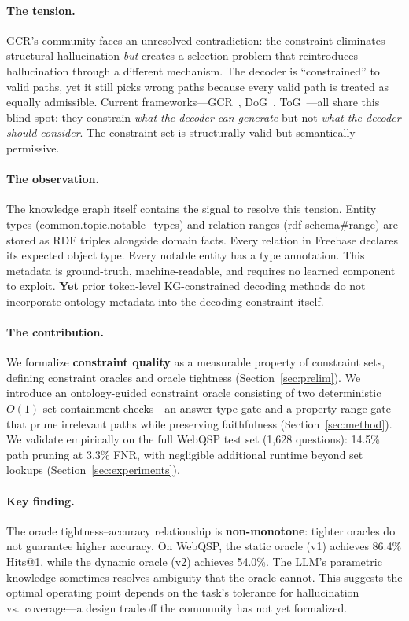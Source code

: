 \documentclass[11pt,twoside]{article}
\begin{document}
\paragraph{The tension.} GCR's community faces an unresolved contradiction: the constraint eliminates structural hallucination \emph{but} creates a selection problem that reintroduces hallucination through a different mechanism. The decoder is ``constrained'' to valid paths, yet it still picks wrong paths because every valid path is treated as equally admissible. Current frameworks---GCR~\citep{luo2025-graph-constrained-reasoning}, DoG~\citep{li2024-decoding-on-graphs}, ToG~\citep{sun2024tog}---all share this blind spot: they constrain \emph{what the decoder can generate} but not \emph{what the decoder should consider}. The constraint set is structurally valid but semantically permissive.

\paragraph{The observation.} The knowledge graph itself contains the signal to resolve this tension. Entity types (\url{common.topic.notable_types}) and relation ranges (rdf-schema\#range) are stored as RDF triples alongside domain facts. Every relation in Freebase declares its expected object type. Every notable entity has a type annotation. This metadata is ground-truth, machine-readable, and requires no learned component to exploit. \textbf{Yet} prior token-level KG-constrained decoding methods do not incorporate ontology metadata into the decoding constraint itself.

\paragraph{The contribution.} We formalize \textbf{constraint quality} as a measurable property of constraint sets, defining constraint oracles and oracle tightness (Section~\ref{sec:prelim}). We introduce an ontology-guided constraint oracle consisting of two deterministic \(O(1)\) set-containment checks---an answer type gate and a property range gate---that prune irrelevant paths while preserving faithfulness (Section~\ref{sec:method}). We validate empirically on the full WebQSP test set (1,628 questions): 14.5\% path pruning at 3.3\% FNR, with negligible additional runtime beyond set lookups (Section~\ref{sec:experiments}).

\paragraph{Key finding.} The oracle tightness--accuracy relationship is \textbf{non-monotone}: tighter oracles do not guarantee higher accuracy. On WebQSP, the static oracle (v1) achieves 86.4\% Hits@1, while the dynamic oracle (v2) achieves 54.0\%. The LLM's parametric knowledge sometimes resolves ambiguity that the oracle cannot. This suggests the optimal operating point depends on the task's tolerance for hallucination vs.\ coverage---a design tradeoff the community has not yet formalized.
\end{document}
